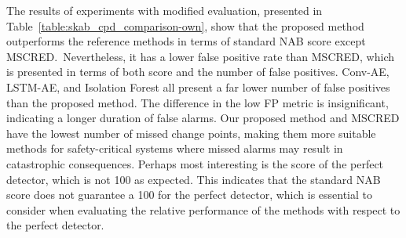 The results of experiments with modified evaluation, presented in Table~\ref{table:skab_cpd_comparison-own}, show that the proposed method outperforms the reference methods in terms of standard NAB score except MSCRED.~Nevertheless, it has a lower false positive rate than MSCRED, which is presented in terms of both score and the number of false positives. Conv-AE, LSTM-AE, and Isolation Forest all present a far lower number of false positives than the proposed method. The difference in the low FP metric is insignificant, indicating a longer duration of false alarms. Our proposed method and MSCRED have the lowest number of missed change points, making them more suitable methods for safety-critical systems where missed alarms may result in catastrophic consequences. Perhaps most interesting is the score of the perfect detector, which is not 100 as expected. This indicates that the standard NAB score does not guarantee a 100 for the perfect detector, which is essential to consider when evaluating the relative performance of the methods with respect to the perfect detector.


